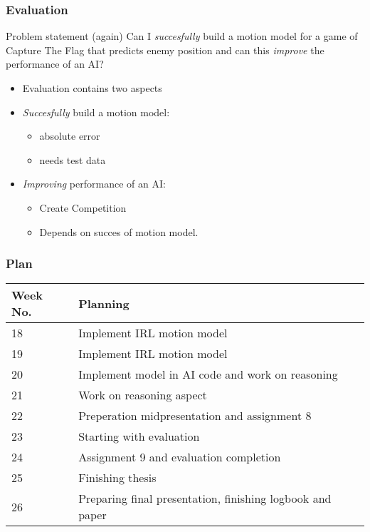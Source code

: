 \documentclass{beamer}
\begin{document}
\begin{frame}
\frametitle{Evaluation}
\begin{block}{Problem statement (again)}
Can I \emph{succesfully} build a motion model for a game of Capture The Flag that predicts enemy
position and can this \emph{improve} the performance of an AI?
\end{block}
\begin{itemize}
    \item Evaluation contains two aspects
    \item \emph{Succesfully} build a motion model:
        \begin{itemize}
            \item absolute error
            \item needs test data
        \end{itemize}
    \item \emph{Improving} performance of an AI:
        \begin{itemize}
            \item Create Competition
            \item Depends on succes of motion model.
        \end{itemize}
\end{itemize}
\end{frame}

\begin{frame}
\frametitle{Plan}
\begin{table}
\centering
    \begin{tabular}{| l | l |}
      \hline                        
      Week No. & Planning \\
      \hline
      \hline
      18 &  Implement IRL motion model \\
      \hline
      19 &  Implement IRL motion model \\
      \hline
      20 &  Implement model in AI code and work on reasoning\\
      \hline
      21 &  Work on reasoning aspect \\
      \hline
      22 &  Preperation midpresentation and assignment 8\\
      \hline
      23 &  Starting with evaluation\\
      \hline
      24 &  Assignment 9 and evaluation completion \\
      \hline
      25 &  Finishing thesis \\
      \hline
      26 &  Preparing final presentation, finishing logbook and paper \\
      \hline
    \end{tabular}
\end{table}
\end{frame}



\end{document}
